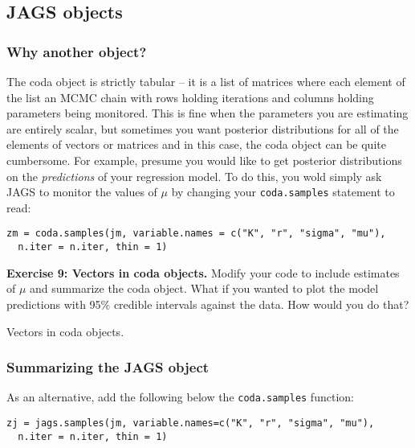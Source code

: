 \documentclass[12pt,english]{article}
\begin{document}
{\subsection{JAGS objects}

\subsubsection{Why another object?}

The coda object is strictly tabular -- it is a list of matrices where each element of the list an MCMC chain with rows holding iterations and columns holding parameters being monitored. This is fine when the parameters you are estimating are entirely scalar, but sometimes you want posterior distributions for all of the elements of vectors or matrices and in this case, the coda object can be quite cumbersome. For example, presume you would like to get posterior distributions on the \emph{predictions} of your regression model. To do this, you wold simply ask JAGS to monitor the values of $\mu$ by changing your \texttt{coda.samples} statement to read:

\begin{Verbatim}
zm = coda.samples(jm, variable.names = c("K", "r", "sigma", "mu"), 
  n.iter = n.iter, thin = 1)
\end{Verbatim}

\bigskip
\belowcaptionskip=-40pt
\begin{exercise}
\begin{mdframed}
\doublespacing
\textbf{Exercise 9: Vectors in coda objects.} Modify your code to include estimates of $\mu$ and summarize the coda object. What if you wanted to plot the model predictions with 95\% credible intervals against the data. How would you do that?
\end{mdframed}
\captionsetup{textformat=empty, labelformat=empty}
\caption[ Vectors in coda objects]{Vectors in coda objects.}
\label{ex:coda vectors}
\end{exercise}
\belowcaptionskip=0pt

\subsubsection{Summarizing the JAGS object\label{sub:Summarizing-the-JAGS}}

As an alternative, add the following below the \texttt{coda.samples} function:

\begin{Verbatim}
zj = jags.samples(jm, variable.names=c("K", "r", "sigma", "mu"),
  n.iter = n.iter, thin = 1)
\end{Verbatim}

}
\end{document}
